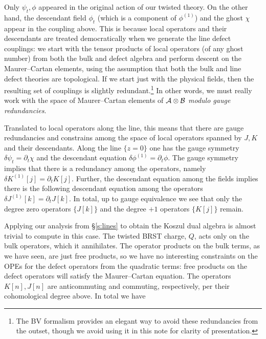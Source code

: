 \documentclass[11pt]{amsart}
\def\natalie#1{{\textcolor{green!65!black}{NMP: {#1}}}}
\begin{document}
Only $\psi_t, \phi$ appeared in the original action of our twisted theory. 
On the other hand, the descendant field $\phi_t$ (which is a component of $\phi^{(1)}$) and the ghost $\chi$ appear in the coupling above. 
This is because local operators and their descendants are treated democratically when we generate the line defect couplings: we start with the tensor products of local operators (of any ghost number) from both the bulk and defect algebra and perform descent on the Maurer--Cartan elements, using the assumption that both the bulk and line defect theories are topological. 
If we start just with the physical fields, then the resulting set of couplings is slightly redundant.\footnote{The BV formalism provides an elegant way to avoid these redundancies from the outset, though we avoid using it in this note for clarity of presentation.} 
In other words, we must really work with the space of Maurer--Cartan elements of $\mathcal A \otimes \mathcal B$ \textit{modulo gauge redundancies}.

Translated to local operators along the line, this means that there are gauge redundancies and constrains among the space of local operators spanned by $J,K$ and their descendants.
Along the line $\{z=0\}$ one has the gauge symmetry $\delta \psi_t = \partial_t \chi$ and the descendant equation $\delta \phi^{(1)} = \partial_t \phi$. 
The gauge symmetry implies that there is a redundancy among the operators, namely $\delta K^{(1)}[j] = \partial_t K[j]$. 
Further, the descendant equation among the fields implies there is the following descendant equation among the operators $\delta J^{(1)} [k] = \partial_t J[k]$. 
In total, up to gauge equivalence we see that only the degree zero operators $\{J[k]\}$ and the degree $+1$ operators $\{K[j]\}$ remain.
 


Applying our analysis from \S \ref{s:lines} to obtain the Koszul dual algebra is almost trivial to compute in this case. 
The twisted BRST charge, $Q$, acts only on the bulk operators, which it annihilates. The operator products on the bulk terms, as we have seen, are just free products, so we have no interesting constraints on the OPEs for the defect operators from the quadratic terms: free products on the defect operators will satisfy the Maurer--Cartan equation. 
The operators $K[n], J[n]$ are anticommuting and commuting, respectively, per their cohomological degree above. In total we have
\end{document}
